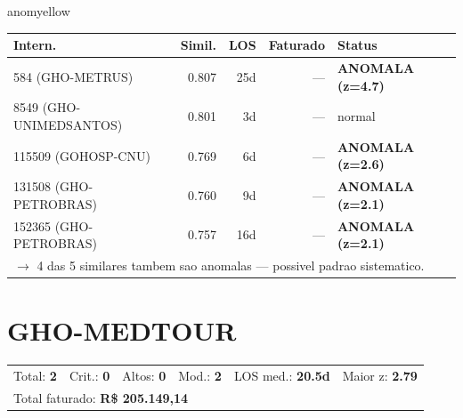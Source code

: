 \documentclass[a4paper,10pt]{article}
\begin{document}
\begin{anomalycard}[Internacao 10 | GHO-IPASGO | MODERADO (z=2.28)]{anomyellow}
\begin{tabular}{l r r r l}\toprule\textbf{Intern.} & \textbf{Simil.} & \textbf{LOS} & \textbf{Faturado} & \textbf{Status} \\\midrule
584 (GHO-METRUS) & 0.807 & 25d & --- & \textcolor{anomred}{\textbf{ANOMALA (z=4.7)}} \\
8549 (GHO-UNIMEDSANTOS) & 0.801 & 3d & --- & \textcolor{jcubeblue}{normal} \\
115509 (GOHOSP-CNU) & 0.769 & 6d & --- & \textcolor{anomred}{\textbf{ANOMALA (z=2.6)}} \\
131508 (GHO-PETROBRAS) & 0.760 & 9d & --- & \textcolor{anomred}{\textbf{ANOMALA (z=2.1)}} \\
152365 (GHO-PETROBRAS) & 0.757 & 16d & --- & \textcolor{anomred}{\textbf{ANOMALA (z=2.1)}} \\
\multicolumn{5}{l}{\textcolor{anomred}{\small $\rightarrow$ 4 das 5 similares tambem sao anomalas --- possivel padrao sistematico.}} \\
\bottomrule\end{tabular}


\end{anomalycard}

\newpage

\clearpage
\section{GHO-MEDTOUR}
\begin{tcolorbox}[colback=lightblue,colframe=jcubeblue,title={\textbf{Resumo --- GHO-MEDTOUR}}]
\begin{tabular}{ll@{\quad}ll@{\quad}ll}
Total: \textbf{2} &
Crit.: \textcolor{anomred}{\textbf{0}} &
Altos: \textcolor{anomorange}{\textbf{0}} &
Mod.: \textcolor{anomyellow}{\textbf{2}} &
LOS med.: \textbf{20.5d} &
Maior z: \textbf{2.79} \\

\multicolumn{6}{l}{Total faturado: \textbf{R\$ 205.149,14}} \\

\end{tabular}
\end{tcolorbox}
\end{document}
